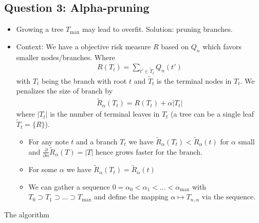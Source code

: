 \documentclass[
]{book}
\providecommand{\tightlist}{%
  \setlength{\itemsep}{0pt}\setlength{\parskip}{0pt}}
\begin{document}
\hypertarget{question-3-alpha-pruning}{%
\subsection{Question 3: Alpha-pruning}\label{question-3-alpha-pruning}}

\begin{itemize}
\tightlist
\item
  Growing a tree \(T_{\max}\) may lead to overfit. Solution: pruning branches.
\item
  Context: We have a objective risk measure \(R\) based on \(Q_n\) which favors smaller nodes/branches. Where
  \begin{align*}
    R(T_t)=\sum_{t'\in \tilde T_t}Q_n(t')
    \end{align*}
  with \(T_t\) being the branch with root \(t\) and \(\tilde T_t\) is the terminal nodes in \(T_t\). We penalizes the size of branch by
  \begin{align*}
    \widetilde R_\alpha(T_t)=R(T_t)+\alpha \vert T_t\vert
    \end{align*}
  where \(\vert T_t\vert\) is the number of terminal leaves in \(T_t\) (a tree can be a single leaf \(\tilde T_t=\{R\}\)).

  \begin{itemize}
  \tightlist
  \item
    For any note \(t\) and a branch \(T_t\) we have \(\widetilde R_\alpha(T_t)<\widetilde R_\alpha(t)\) for \(\alpha\) small and \(\frac{\partial}{\partial \alpha}\widetilde R_\alpha(T)=\vert T\vert\) hence grows faster for the branch.
  \item
    For some \(\alpha\) we have \(\widetilde R_\alpha(T_t)=\widetilde R_\alpha(t)\)
  \item
    We can gather a sequence \(0=\alpha_0<\alpha_1<...<\alpha_{\max}\) with \(T_0\supset T_1\supset ... \supset T_{\max}\) and define the mapping \(\alpha \mapsto T_{n,\alpha}\) via the sequence.
  \end{itemize}
\end{itemize}

The algorithm
\end{document}
